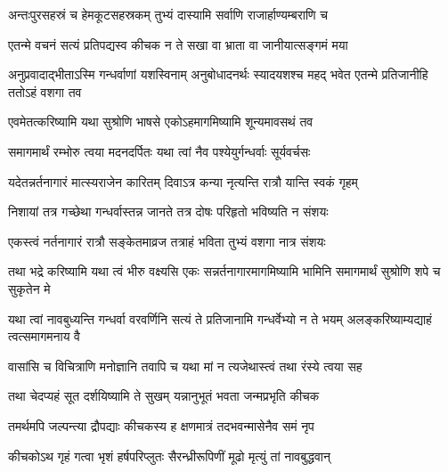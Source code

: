 \twolineshloka
{अन्तःपुरसहस्रं च हेमकूटसहस्रकम्}
{तुभ्यं दास्यामि सर्वाणि राजार्हाण्यम्बराणि च}




\twolineshloka
{एतन्मे वचनं सत्यं प्रतिपद्यस्व कीचक}
{न ते सखा वा भ्राता वा जानीयात्सङ्गमं मया}


\threelineshloka
{अनुप्रवादाद्भीताऽस्मि गन्धर्वाणां यशस्विनाम्}
{अनुबोधादनर्थः स्यादयशश्च महद् भवेत}
{एतन्मे प्रतिजानीहि ततोऽहं वशगा तव}




\twolineshloka
{एवमेतत्करिष्यामि यथा सुश्रोणि भाषसे}
{एकोऽहमागमिष्यामि शून्यमावसथं तव}


\twolineshloka
{समागमार्थं रम्भोरु त्वया मदनदर्पितः}
{यथा त्वां नैव पश्येयुर्गन्धर्वाः सूर्यवर्चसः}




\twolineshloka
{यदेतन्नर्तनागारं मात्स्यराजेन कारितम्}
{दिवाऽत्र कन्या नृत्यन्ति रात्रौ यान्ति स्वकं गृहम्}


\twolineshloka
{निशायां तत्र गच्छेथा गन्धर्वास्तन्न जानते}
{तत्र दोषः परिहृतो भविष्यति न संशयः}


\twolineshloka
{एकस्त्वं नर्तनागारं रात्रौ सङ्केतमाव्रज}
{तत्राहं भविता तुभ्यं वशगा नात्र संशयः}




\threelineshloka
{तथा भद्रे करिष्यामि यथा त्वं भीरु वक्ष्यसि}
{एकः सन्नर्तनागारमागमिष्यामि भामिनि}
{समागमार्थं सुश्रोणि शपे च सुकृतेन मे}


\threelineshloka
{यथा त्वां नावबुध्यन्ति गन्धर्वा वरवर्णिनि}
{सत्यं ते प्रतिजानामि गन्धर्वेभ्यो न ते भयम्}
{अलङ्करिष्याम्यद्याहं त्वत्समागमनाय वै}


\twolineshloka
{वासांसि च विचित्राणि मनोज्ञानि तवापि च}
{यथा मां न त्यजेथास्त्वं तथा रंस्ये त्वया सह}




\twolineshloka
{तथा चेदप्यहं सूत दर्शयिष्यामि ते सुखम्}
{यन्नानुभूतं भवता जन्मप्रभृति कीचक}



\twolineshloka
{तमर्थमपि जल्पन्त्या द्रौपद्याः कीचकस्य ह}
{क्षणमात्रं तदभवन्मासेनैव समं नृप}


\twolineshloka
{कीचकोऽथ गृहं गत्वा भृशं हर्षपरिप्लुतः}
{सैरन्ध्रीरूपिणीं मूढो मृत्युं तां नावबुद्धवान्}


